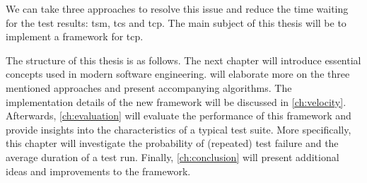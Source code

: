 \noindent We can take three approaches to resolve this issue and reduce the time waiting for the test results: \acrfull{tsm}, \acrfull{tcs} and \acrfull{tcp}. The main subject of this thesis will be to implement a framework for \acrshort{tcp}.

\noindent The structure of this thesis is as follows. The next chapter will introduce essential concepts used in modern software engineering.  will elaborate more on the three mentioned approaches and present accompanying algorithms. The implementation details of the new framework will be discussed in \cref{ch:velocity}. Afterwards, \cref{ch:evaluation} will evaluate the performance of this framework and provide insights into the characteristics of a typical test suite. More specifically, this chapter will investigate the probability of (repeated) test failure and the average duration of a test run. Finally, \cref{ch:conclusion} will present additional ideas and improvements to the framework.